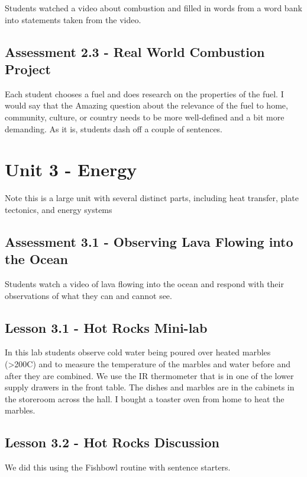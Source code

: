 \documentclass[12pt]{article}
\begin{document}
Students watched a video about combustion and filled in words from a word bank into statements taken from the video.

\subsection*{Assessment 2.3 - Real World Combustion Project} 

Each student chooses a fuel and does research on the properties of the fuel. I would say that the Amazing question about the
relevance of the fuel to home, community, culture, or country needs to be more well-defined and a bit more demanding. As it is, students dash off a couple of sentences.

\section{Unit 3 - Energy}

Note this is a large unit with several distinct parts, including heat transfer,
plate tectonics, and energy systems

\subsection*{Assessment 3.1 - Observing Lava Flowing into the Ocean} 

Students watch a video of lava flowing into the ocean and respond with their observations of what they can and cannot see.

\subsection{Lesson 3.1 - Hot Rocks Mini-lab} 

In this lab students observe cold water being poured over heated marbles (>200C) and to measure the temperature of the marbles and water before and after they are combined. We use the IR thermometer that is in one of the lower supply drawers in the front table. The dishes and marbles are in the cabinets in the
storeroom across the hall. I bought a toaster oven from home to heat the marbles.

\subsection{Lesson 3.2 - Hot Rocks Discussion} 

We did this using the Fishbowl routine with sentence starters.
\end{document}
